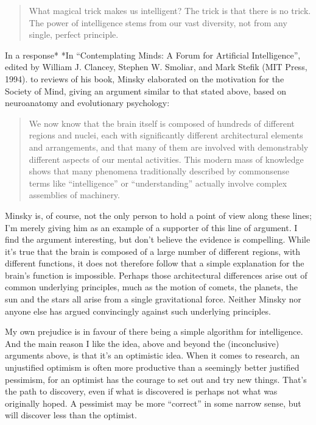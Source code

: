 \begin{quote}
What magical trick makes us intelligent? The trick is that there is no trick. The power of intelligence stems from our vast diversity, not from any single, perfect principle.
\end{quote}


In a response* *In ``Contemplating Minds: A Forum for Artificial Intelligence'', edited by William J. Clancey, Stephen W. Smoliar, and Mark Stefik (MIT Press, 1994). to reviews of his book, Minsky elaborated on the motivation for the Society of Mind, giving an argument similar to that stated above, based on neuroanatomy and evolutionary psychology:



\begin{quote}
We now know that the brain itself is composed of hundreds of different regions and nuclei, each with significantly different architectural elements and arrangements, and that many of them are involved with demonstrably different aspects of our mental activities. This modern mass of knowledge shows that many phenomena traditionally described by commonsense terms like ``intelligence'' or ``understanding'' actually involve complex assemblies of machinery.
\end{quote}


Minsky is, of course, not the only person to hold a point of view along these lines; I'm merely giving him as an example of a supporter of this line of argument. I find the argument interesting, but don't believe the evidence is compelling. While it's true that the brain is composed of a large number of different regions, with different functions, it does not therefore follow that a simple explanation for the brain's function is impossible. Perhaps those architectural differences arise out of common underlying principles, much as the motion of comets, the planets, the sun and the stars all arise from a single gravitational force. Neither Minsky nor anyone else has argued convincingly against such underlying principles.


My own prejudice is in favour of there being a simple algorithm for intelligence. And the main reason I like the idea, above and beyond the (inconclusive) arguments above, is that it's an optimistic idea. When it comes to research, an unjustified optimism is often more productive than a seemingly better justified pessimism, for an optimist has the courage to set out and try new things. That's the path to discovery, even if what is discovered is perhaps not what was originally hoped. A pessimist may be more ``correct'' in some narrow sense, but will discover less than the optimist.


